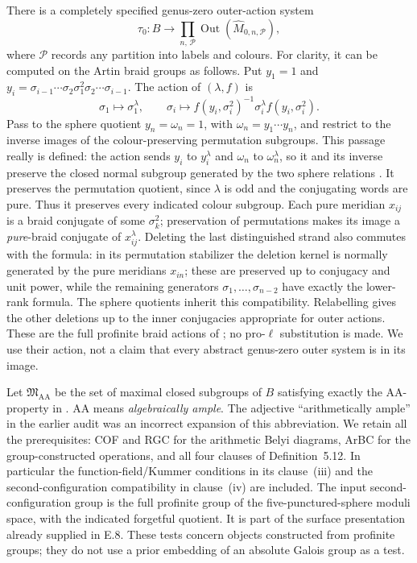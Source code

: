 There is a completely specified genus-zero outer-action system
\[
 \tau_0:B\longrightarrow
 \prod_{n,\,\mathcal P}\operatorname{Out}
                    (\widehat M_{0,n,\mathcal P}),             \tag{E.14.4}
\]
where $\mathcal P$ records any partition into labels and colours.
For clarity, it can be computed on the Artin braid groups as follows.
Put $y_1=1$ and
$y_i=\sigma_{i-1}\cdots\sigma_2\sigma_1^2
\sigma_2\cdots\sigma_{i-1}$. The action of $(\lambda,f)$ is
\[
 \sigma_1\longmapsto\sigma_1^\lambda,
 \qquad
 \sigma_i\longmapsto
 f(y_i,\sigma_i^2)^{-1}\sigma_i^\lambda f(y_i,\sigma_i^2).
                                                               \tag{E.14.5}
\]
Pass to the sphere quotient $y_n=\omega_n=1$, with
$\omega_n=y_1\cdots y_n$, and restrict to the inverse images of the
colour-preserving permutation subgroups. This passage really is defined:
the action sends $y_i$ to $y_i^\lambda$ and $\omega_n$ to
$\omega_n^\lambda$, so it and its inverse preserve the closed normal
subgroup generated by the two sphere relations
\citep[Appendix, author p.~35]{E_HarbaterSchneps2000}.
It preserves the permutation quotient, since $\lambda$ is odd and
the conjugating words are pure. Thus it preserves every indicated
colour subgroup. Each pure meridian $x_{ij}$ is a braid conjugate of
some $\sigma_k^2$; preservation of permutations makes its image a
\emph{pure}-braid conjugate of $x_{ij}^{\lambda}$.
Deleting the last distinguished strand also commutes
with the formula: in its permutation stabilizer the deletion kernel is
normally generated by the pure meridians $x_{in}$; these are preserved
up to conjugacy and unit power, while the remaining generators
$\sigma_1,\ldots,\sigma_{n-2}$ have exactly the lower-rank formula.
The sphere quotients inherit this compatibility. Relabelling gives
the other deletions up to the inner conjugacies appropriate for outer
actions. These are the full
profinite braid actions of \citet[\S2, Main Theorem~(iii), equation~(5);
\S5, Propositions~10--11]{E_LochakSchneps1994}; no pro-$\ell$
substitution is made. We use their action, not a claim that every
abstract genus-zero outer system is in its image.

Let $\mathfrak M_{\mathrm{AA}}$ be the set of maximal closed
subgroups of $B$ satisfying exactly the AA-property in
\citet[Definition~3.3(v); Theorem~4.4(ii); Definition~5.12]{E_HMT2025}.
AA means \emph{algebraically ample}. The adjective
``arithmetically ample'' in the earlier audit was an incorrect
expansion of this abbreviation. We retain all the prerequisites:
COF and RGC for the arithmetic Belyi diagrams, ArBC for the
group-constructed operations, and all four clauses of Definition~5.12.
In particular the function-field/Kummer conditions in its clause~(iii)
and the second-configuration compatibility in clause~(iv) are included.
The input second-configuration group is the full profinite group of
the five-punctured-sphere moduli space, with the indicated forgetful
quotient. It is part of the surface presentation already supplied in E.8.
These tests concern objects constructed from profinite groups; they
do not use a prior embedding of an absolute Galois group as a test.

